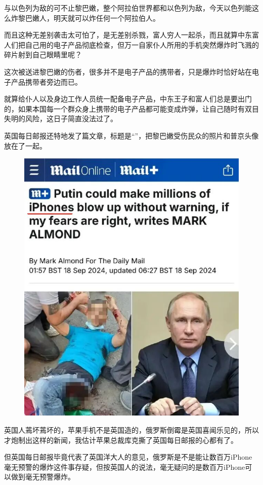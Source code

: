 \documentclass[UTF8,11pt,oneside]{ctexart}
\begin{document}
与以色列为敌的可不止黎巴嫩，整个阿拉伯世界都和以色列为敌，今天以色列能这么炸黎巴嫩人，明天就可以炸任何一个阿拉伯人。

而且这种无差别袭击太可怕了，是无差别杀戮，富人穷人一起杀，而且就算中东富人们把自己用的电子产品彻底检查，但万一自家仆人所用的手机突然爆炸时飞溅的碎片射到自己眼睛里呢？

这次被送进黎巴嫩的伤者，很多并不是电子产品的携带者，只是爆炸时恰好站在电子产品携带者旁边而已。

就算给仆人以及身边工作人员统一配备电子产品，中东王子和富人们总是要出门的，如果本国每一个群众身上携带的电子产品都可能变成炸弹，让自己随时有双目失明的风险，这日子简直没法过了。

英国每日邮报还特地发了篇文章，标题是“”，把黎巴嫩受伤民众的照片和普京头像放在了一起。

\begin{figure}[H]
    \centering
    \includegraphics[width=12cm]{2024-09-21-002.jpg}
\end{figure}

英国人蔫坏蔫坏的，苹果手机不是英国造的，俄罗斯倒霉是英国喜闻乐见的，所以才炮制出这样的新闻，我估计苹果总裁库克撕了英国每日邮报的心都有了。

但英国每日邮报毕竟代表了英国洋大人的意见，俄罗斯是不是能让数百万iPhone毫无预警的爆炸这件事存疑，但按英国人的说法，毫无疑问的是数百万iPhone可以做到毫无预警爆炸。
\end{document}
